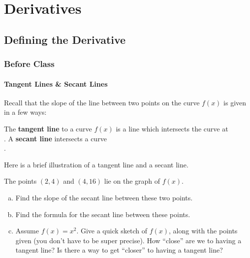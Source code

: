 \documentclass[notes]{subfiles}
\begin{document}
	\chapter{Derivatives}
	\setcounter{section}{1}
	\fancyhead[LO,RE]{\bfseries \currentname}
	\fancyfoot[C]{{}}
	\fancyfoot[LO,RE]{\large \thepage}	%

\section*{Defining the Derivative}\label{cs31}
	\subsection*{Before Class}
	\subsubsection*{Tangent Lines \& Secant Lines}
		Recall that the slope of the line between two points on the curve \(f(x)\) is given in a few ways:
			\vspace{1.5in}

		\begin{defn}
			The \textbf{tangent line} to a curve \(f(x)\) is a line which intersects the curve at \\[15pt]  .  A \textbf{secant line} intersects a curve \\[15pt] .
				
		\end{defn}
		Here is a brief illustration of a tangent line and a secant line.
			\newpage
			
		\begin{ex}
			The points \((2,4)\) and \((4,16)\) lie on the graph of \(f(x)\).  
			\begin{enumerate}[(a)]
				\item Find the slope of the secant line between these two points.
				\item Find the formula for the secant line between these points.
					
				\item Assume \(f(x) = x^2\).  Give a quick sketch of \(f(x)\), along with the points given (you don't have to be super precise).  How ``close'' are we to having a tangent line?  Is there a way to get ``closer'' to having a tangent line?
			\end{enumerate}
		\end{ex}
			\newpage
						
\end{document}
